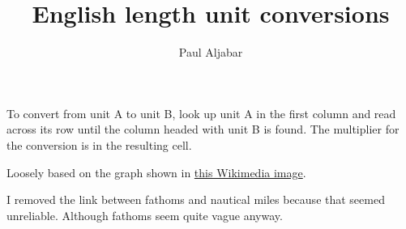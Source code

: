 \documentclass[11pt]{amsart}
\title{English length unit conversions}
\author{Paul Aljabar}
\begin{document}
\maketitle


To convert from unit A to unit B, look up unit A in the first column and read across its row until the column headed with unit B is found. The multiplier for the conversion is in the resulting cell.

\vspace{3em}

Loosely based on the graph shown in \href{https://commons.wikimedia.org/wiki/File:English_Length_Units_Graph.svg}{this Wikimedia image}.

I removed the link between fathoms and nautical miles because that seemed unreliable. Although fathoms seem quite vague anyway. 

\vspace{10em}

\end{document}
